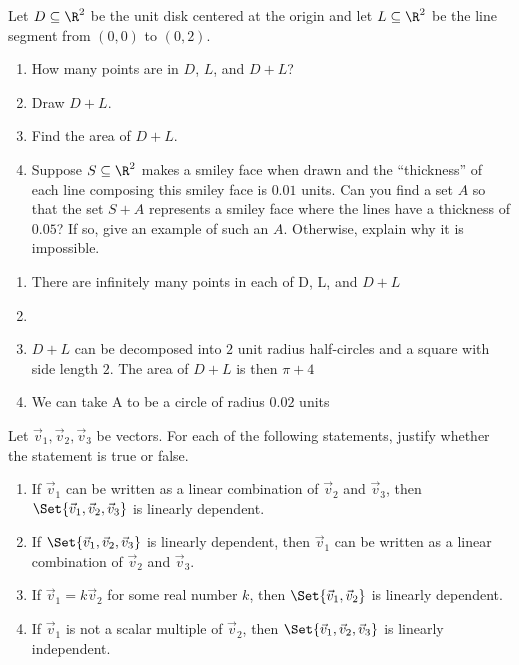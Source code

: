 \begin{exercises}
\begin{problist}
		\prob Let $D\subseteq\R^2$ be the unit disk centered at the origin and let $L\subseteq \R^2$ be
		the line segment from $(0,0)$ to $(0,2)$.
		\begin{enumerate}
			\item How many points are in $D$, $L$, and $D+L$?
			\item Draw $D+L$.
			\item Find the area of $D+L$.
			\item Suppose $S\subseteq\R^2$ makes a smiley face when drawn and the ``thickness'' of
				each line composing this smiley face is $0.01$ units. Can you find a set $A$ so
				that the set $S+A$ represents a smiley face where the lines have a thickness of $0.05$?
				If so, give an example of such an $A$. Otherwise, explain why it is impossible.
		\end{enumerate}
		\begin{solution}
			\begin{enumerate}
				\item There are infinitely many points in each of D, L, and $D+L$
				\item %
				\item $D+L$ can be decomposed into $2$ unit radius half-circles and a square with side length 
				$2$. The area of $D+L$ is then $\pi+4$
				\item We can take A to be a circle of radius $0.02$ units
			\end{enumerate}
		\end{solution}
		
		\prob Let $\vec v_{1}, \vec v_{2}, \vec v_{3}$ be vectors. For each of the following statements,
		justify whether the statement is true or false.
		\begin{enumerate}
			\item If $\vec v_{1}$ can be written as a linear combination
				of $\vec v_{2}$ and $\vec v_{3}$, then $\Set{\vec
				v_1,\vec v_2,\vec v_3}$ is linearly dependent.

			\item If $\Set{\vec v_1,\vec v_2,\vec v_3}$ is linearly dependent,
				then $\vec v_{1}$ can be written as a linear combination
				of $\vec v_{2}$ and $\vec v_{3}$.

			\item If $\vec v_{1}=k\vec v_{2}$ for some real number $k$,
				then $\Set{\vec v_1,\vec v_2}$ is linearly dependent.

			\item If $\vec v_{1}$ is not a scalar multiple of $\vec
				v_{2}$, then $\Set{\vec v_1,\vec v_2,\vec v_3}$ is
				linearly independent.


\end{enumerate}
\end{problist}
\end{exercises}
